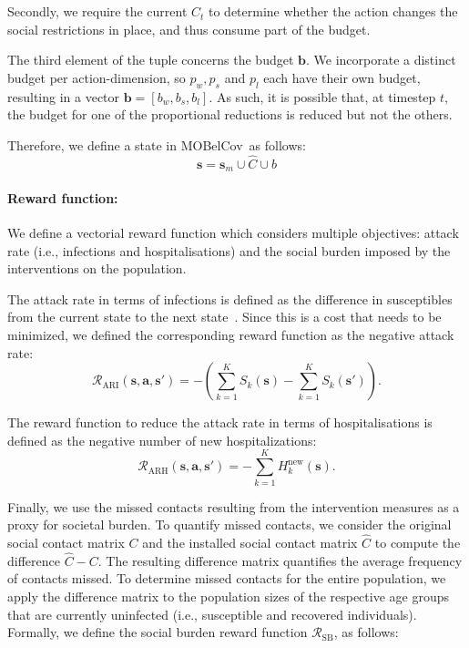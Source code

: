 \documentclass{article}
\renewcommand{\cite}[1]{\citep{#1}}
\newcommand{\mdprewardfn}{\mathcal{R}}
\newcommand{\mdpstate}{\mathbf{s}}
\newcommand{\mdpaction}{\mathbf{a}}
\newcommand{\momdpname}{MOBelCov}
\newcommand{\agegroups}{K}
\newcommand{\budget}{\bm{b}}
\begin{document}
Secondly, we require the current $\hat{C}_t$ to determine whether the action changes the social restrictions in place, and thus consume part of the budget.

The third element of the tuple concerns the budget $\budget$. We incorporate a distinct budget per action-dimension, so $p_{w}, p_{s}$ and $p_{l}$ each have their own budget, resulting in a vector $\budget = [b_w, b_s, b_l]$. As such, it is possible that, at timestep $t$, the budget for one of the proportional reductions is reduced but not the others.

Therefore, we define a state in \momdpname\ as follows:
\begin{equation}
    \mdpstate = \mdpstate_m \cup \hat{C} \cup b
\end{equation}

\paragraph{Reward function:} We define a vectorial reward function which considers multiple objectives: attack rate (i.e., infections and hospitalisations) and the social burden imposed by the interventions on the population.

The attack rate in terms of infections is defined as the difference in susceptibles from the current state to the next state~\cite{libin2020}. Since this is a cost that needs to be minimized, we defined the corresponding reward function as the negative attack rate:
\begin{equation}
\mdprewardfn_{\text{ARI}}(\mdpstate,\mdpaction,\mdpstate') = -(\sum_{k=1}^{\agegroups}S_k(\mdpstate)-\sum_{k=1}^{\agegroups}S_k(\mdpstate')).
\end{equation}

The reward function to reduce the attack rate in terms of hospitalisations is defined as the negative number of new hospitalizations:
\begin{equation}
\mdprewardfn_{\text{ARH}}(\mdpstate,\mdpaction,\mdpstate') = -\sum_{k=1}^{\agegroups}H^\text{new}_k(\mdpstate).
\label{eqn:attack-rate-hosp}
\end{equation}

Finally, we use the missed contacts resulting from the intervention measures as a proxy for societal burden. To quantify missed contacts, we consider the original social contact matrix $C$ and the installed social contact matrix $\hat{C}$ to compute the difference $\hat{C} - C$. 
The resulting difference matrix quantifies the average frequency of contacts missed. To determine missed contacts for the entire population, we apply the difference matrix to the population sizes of the respective age groups that are currently uninfected (i.e., susceptible and recovered individuals). Formally, we define the social burden reward function $\mdprewardfn_{\text{SB}}$, as follows:
\end{document}
